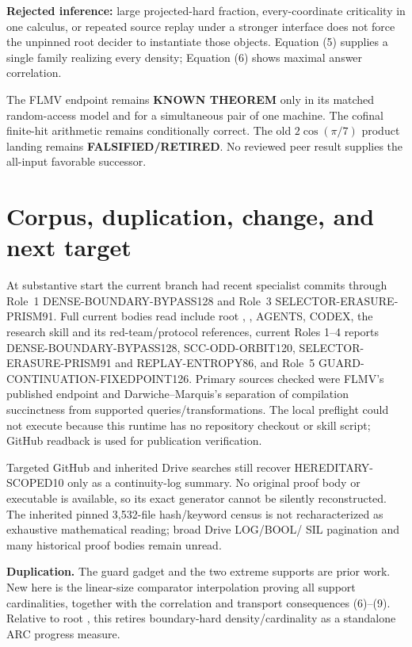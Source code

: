 \documentclass[11pt]{article}
\begin{document}
\textbf{Rejected inference:} large projected-hard fraction, every-coordinate
criticality in one calculus, or repeated source replay under a stronger
interface does not force the unpinned root decider to instantiate those
objects.  Equation (5) supplies a single family realizing every density;
Equation (6) shows maximal answer correlation.

The FLMV endpoint remains \textbf{KNOWN THEOREM} only in its matched
random-access model and for a simultaneous pair of one machine.  The
cofinal finite-hit arithmetic remains conditionally correct.  The old
$2\cos(\pi/7)$ product landing remains \textbf{FALSIFIED/RETIRED}.  No
reviewed peer result supplies the all-input favorable successor.

\section{Corpus, duplication, change, and next target}
At substantive start the current branch had recent specialist commits
through Role~1 DENSE-BOUNDARY-BYPASS128 and Role~3
SELECTOR-ERASURE-PRISM91.  Full current bodies read include root
, , AGENTS, CODEX, the research skill and
its red-team/protocol references, current Roles 1--4 reports
DENSE-BOUNDARY-BYPASS128, SCC-ODD-ORBIT120,
SELECTOR-ERASURE-PRISM91 and REPLAY-ENTROPY86, and Role~5
GUARD-CONTINUATION-FIXEDPOINT126.  Primary sources checked were FLMV's
published endpoint and Darwiche--Marquis's separation of compilation
succinctness from supported queries/transformations.  The local preflight
could not execute because this runtime has no repository checkout or skill
script; GitHub readback is used for publication verification.

Targeted GitHub and inherited Drive searches still recover
HEREDITARY-SCOPED10 only as a continuity-log summary.  No original proof
body or executable is available, so its exact generator cannot be silently
reconstructed.  The inherited pinned 3,532-file hash/keyword census is not
recharacterized as exhaustive mathematical reading; broad Drive LOG/BOOL/
SIL pagination and many historical proof bodies remain unread.

\textbf{Duplication.}  The guard gadget and the two extreme supports are
prior work.  New here is the linear-size comparator interpolation proving
all support cardinalities, together with the correlation and transport
consequences (6)--(9).  Relative to root , this retires
boundary-hard density/cardinality as a standalone ARC progress measure.
\end{document}
